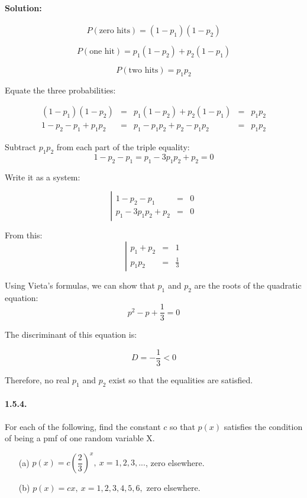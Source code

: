 \documentclass[12pt,a4paper]{article}
\begin{document}
\paragraph{Solution:}

	\[
		P(\textrm{zero hits}) = (1-p_{1})(1-p_{2})
	\]

	\[
		P(\textrm{one hit}) = p_{1}(1-p_{2}) + p_{2}(1-p_{1})
	\]

	\[
		P(\textrm{two hits}) = p_{1}p_{2}
	\]

	Equate the three probabilities:

	\[
	\begin{array}{lclcl}
		(1-p_{1})(1-p_{2}) & = & p_{1}(1-p_{2}) + p_{2}(1-p_{1}) & = & p_{1}p_{2}\\
		1 - p_{2} - p_{1} + p_{1}p_{2} & = & p_{1} - p_{1}p_{2} + p_{2} - p_{1}p_{2} & = & p_{1}p_{2}
	\end{array}
	\]

	Subtract $p_{1}p_{2}$ from each part of the triple equality:
	\[
		1 - p_{2} - p_{1} = p_{1} - 3p_{1}p_{2} + p_{2} =  0
	\]

	Write it as a system:

	\[
		\left|
		\begin{array}{lcl}
			1 - p_{2} - p_{1} & = & 0\\
			p_{1} - 3p_{1}p_{2} + p_{2} & = &  0
		\end{array}
		\right.
	\]

	From this:
	\[
	\left|
	\begin{array}{lcl}
			p_{1} + p_{2} & = & 1\\
			p_{1}p_{2} & = & \frac{1}{3}
	\end{array}
	\right.
	\]

	Using Vieta's formulas, we can show that $p_{1}$ and $p_{2}$ are the roots of the quadratic equation:
	\[
		p^{2} - p + \frac{1}{3} = 0 
	\]

	The discriminant of this equation is:

	\[
		D = -\frac{1}{3} < 0
	\]

	Therefore, no real $p_{1}$ and $p_{2}$ exist so that the equalities are satisfied. 
	
\paragraph{1.5.4.} For each of the following, find the constant $c$ so that $p(x)$ satisfies the condition of being a pmf of one random variable X.
	\begin{enumerate}
		\item[(a)] $p(x) = c\left(\dfrac{2}{3}\right)^{x},\ x = 1, 2, 3, . . .$, zero elsewhere.
		
		\item[(b)] $p(x) = cx,\ x = 1, 2, 3, 4, 5, 6,$ zero elsewhere.
	\end{enumerate}
\end{document}
